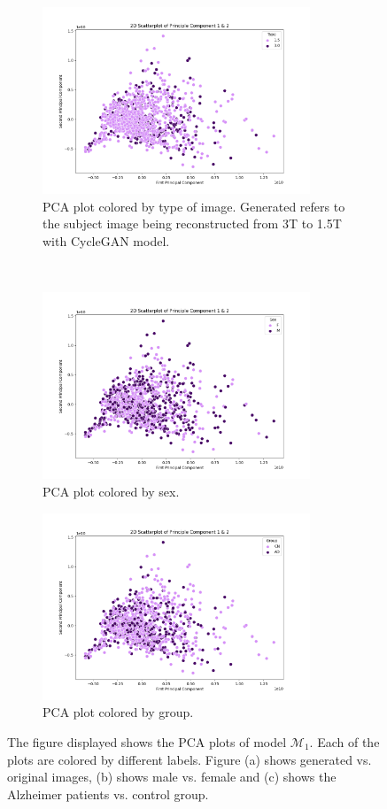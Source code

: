 \documentclass[11pt, fleqn, titlepage]{article}
\newcommand{\1}[1]{\mathds{1}\left[#1\right]}
\begin{document}
\begin{figure}[H]
	\centering
	\begin{subfigure}[t]{0.59\textwidth}
		\centering
		\includegraphics[height=2.2in]{imgs/classifier/not_generated_imgs_pca_type}%
		\caption{PCA plot colored by type of image. Generated refers to the subject image being reconstructed from 3T to 1.5T with CycleGAN model.}
	\end{subfigure}%
	~
	\begin{subfigure}[t]{0.5\textwidth}
		\centering
		\includegraphics[height=2.2in]{imgs/classifier/not_generated_imgs_pca_sex}%
		\caption{PCA plot colored by sex.}	
	\end{subfigure}
	\begin{subfigure}[t]{0.5\textwidth}
		\centering
		\includegraphics[height=2.2in]{imgs/classifier/not_generated_imgs_pca_group}%
		\caption{PCA plot colored by group.}
	\end{subfigure}
	
	\caption{The figure displayed shows the PCA plots of model $ \mathcal M_1 $. Each of the plots are colored by different labels. Figure (a) shows generated vs. original images, (b) shows male vs. female and (c) shows the Alzheimer patients vs. control group. }
	\label{fig:pca_not_gen}
\end{figure}
\end{document}
